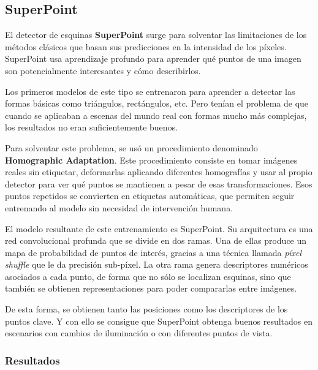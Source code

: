 
\subsection{SuperPoint}

El detector de esquinas \textbf{SuperPoint} \cite{detone2018superpoint} surge para solventar las limitaciones de los métodos clásicos que basan sus predicciones en la intensidad de los píxeles. SuperPoint usa aprendizaje profundo para aprender qué puntos de una imagen son potencialmente interesantes y cómo describirlos.

Los primeros modelos de este tipo se entrenaron para aprender a detectar las formas básicas como triángulos, rectángulos, etc. Pero tenían el problema de que cuando se aplicaban a escenas del mundo real con formas mucho más complejas, los resultados no eran suficientemente buenos.  

Para solventar este problema, se usó un procedimiento denominado \textbf{Homographic Adaptation}. Este procedimiento consiste en tomar imágenes reales sin etiquetar, deformarlas aplicando diferentes homografías y usar al propio detector para ver qué puntos se mantienen a pesar de esas transformaciones. Esos puntos repetidos se convierten en etiquetas automáticas, que permiten seguir entrenando al modelo sin necesidad de intervención humana.  

El modelo resultante de este entrenamiento es SuperPoint. Su arquitectura es una red convolucional profunda que se divide en dos ramas. Una de ellas produce un mapa de probabilidad de puntos de interés, gracias a una técnica llamada \emph{píxel shuffle} que le da precisión sub-píxel. La otra rama genera descriptores numéricos asociados a cada punto, de forma que no sólo se localizan esquinas, sino que también se obtienen representaciones para poder compararlas entre imágenes.  

De esta forma, se obtienen tanto las posiciones como los descriptores de los puntos clave. Y con ello se consigue que SuperPoint obtenga buenos resultados en escenarios con cambios de iluminación o con diferentes puntos de vista.


\subsubsection{Resultados}


